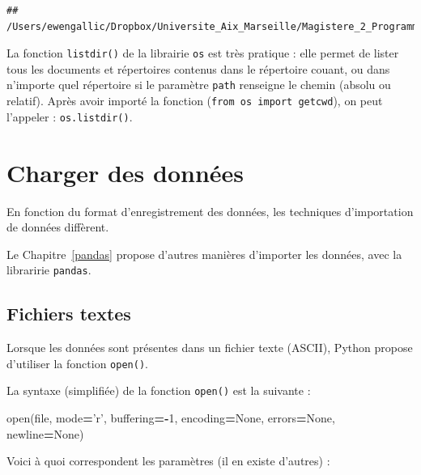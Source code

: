 \documentclass[12pt,]{book}
\newenvironment{Shaded}{\begin{snugshade}}{\end{snugshade}}
\newcommand{\DecValTok}[1]{\textcolor[rgb]{0.00,0.00,0.81}{#1}}
\newcommand{\StringTok}[1]{\textcolor[rgb]{0.31,0.60,0.02}{#1}}
\newcommand{\VariableTok}[1]{\textcolor[rgb]{0.00,0.00,0.00}{#1}}
\newcommand{\OperatorTok}[1]{\textcolor[rgb]{0.81,0.36,0.00}{\textbf{#1}}}
\newcommand{\BuiltInTok}[1]{#1}
\newcommand{\NormalTok}[1]{#1}
\numberwithin{equation}{section}
\numberwithin{countremarque}{section}
\let\BeginKnitrBlock\begin \let\EndKnitrBlock\end
\begin{document}
\begin{lstlisting}
## /Users/ewengallic/Dropbox/Universite_Aix_Marseille/Magistere_2_Programming_for_big_data/Cours/chapters/python/Python_pour_economistes
\end{lstlisting}

\BeginKnitrBlock{remarque}
La fonction \texttt{listdir()} de la librairie \texttt{os} est très
pratique : elle permet de lister tous les documents et répertoires
contenus dans le répertoire couant, ou dans n'importe quel répertoire si
le paramètre \texttt{path} renseigne le chemin (absolu ou relatif).
Après avoir importé la fonction (\texttt{from\ os\ import\ getcwd}), on
peut l'appeler : \texttt{os.listdir()}.
\EndKnitrBlock{remarque}

\section{Charger des données}\label{charger-des-donnees}

En fonction du format d'enregistrement des données, les techniques
d'importation de données diffèrent.

\BeginKnitrBlock{remarque}
Le Chapitre~\ref{pandas} propose d'autres manières d'importer les
données, avec la libraririe \texttt{pandas}.
\EndKnitrBlock{remarque}

\subsection{Fichiers textes}\label{import-fichiers-texte}

Lorsque les données sont présentes dans un fichier texte (ASCII), Python
propose d'utiliser la fonction \texttt{open()}.

La syntaxe (simplifiée) de la fonction \texttt{open()} est la suivante :

\begin{Shaded}
\begin{Highlighting}[]
\BuiltInTok{open}\NormalTok{(}\BuiltInTok{file}\NormalTok{, mode}\OperatorTok{=}\StringTok{'r'}\NormalTok{, buffering}\OperatorTok{=-}\DecValTok{1}\NormalTok{,}
\NormalTok{  encoding}\OperatorTok{=}\VariableTok{None}\NormalTok{, errors}\OperatorTok{=}\VariableTok{None}\NormalTok{, newline}\OperatorTok{=}\VariableTok{None}\NormalTok{)}
\end{Highlighting}
\end{Shaded}

Voici à quoi correspondent les paramètres (il en existe d'autres) :
\end{document}
